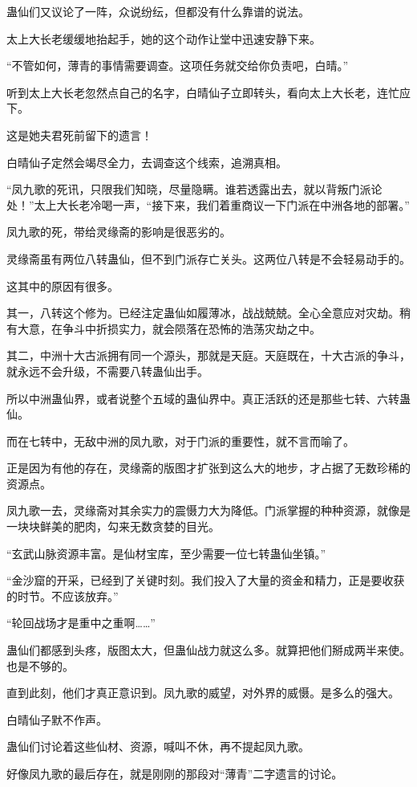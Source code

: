 \begin{this_body}
蛊仙们又议论了一阵，众说纷纭，但都没有什么靠谱的说法。

太上大长老缓缓地抬起手，她的这个动作让堂中迅速安静下来。

“不管如何，薄青的事情需要调查。这项任务就交给你负责吧，白晴。”

听到太上大长老忽然点自己的名字，白晴仙子立即转头，看向太上大长老，连忙应下。

这是她夫君死前留下的遗言！

白晴仙子定然会竭尽全力，去调查这个线索，追溯真相。

“凤九歌的死讯，只限我们知晓，尽量隐瞒。谁若透露出去，就以背叛门派论处！”太上大长老冷喝一声，“接下来，我们着重商议一下门派在中洲各地的部署。”

凤九歌的死，带给灵缘斋的影响是很恶劣的。

灵缘斋虽有两位八转蛊仙，但不到门派存亡关头。这两位八转是不会轻易动手的。

这其中的原因有很多。

其一，八转这个修为。已经注定蛊仙如履薄冰，战战兢兢。全心全意应对灾劫。稍有大意，在争斗中折损实力，就会陨落在恐怖的浩荡灾劫之中。

其二，中洲十大古派拥有同一个源头，那就是天庭。天庭既在，十大古派的争斗，就永远不会升级，不需要八转蛊仙出手。

所以中洲蛊仙界，或者说整个五域的蛊仙界中。真正活跃的还是那些七转、六转蛊仙。

而在七转中，无敌中洲的凤九歌，对于门派的重要性，就不言而喻了。

正是因为有他的存在，灵缘斋的版图才扩张到这么大的地步，才占据了无数珍稀的资源点。

凤九歌一去，灵缘斋对其余实力的震慑力大为降低。门派掌握的种种资源，就像是一块块鲜美的肥肉，勾来无数贪婪的目光。

“玄武山脉资源丰富。是仙材宝库，至少需要一位七转蛊仙坐镇。”

“金沙窟的开采，已经到了关键时刻。我们投入了大量的资金和精力，正是要收获的时节。不应该放弃。”

“轮回战场才是重中之重啊……”

蛊仙们都感到头疼，版图太大，但蛊仙战力就这么多。就算把他们掰成两半来使。也是不够的。

直到此刻，他们才真正意识到。凤九歌的威望，对外界的威慑。是多么的强大。

白晴仙子默不作声。

蛊仙们讨论着这些仙材、资源，喊叫不休，再不提起凤九歌。

好像凤九歌的最后存在，就是刚刚的那段对“薄青”二字遗言的讨论。


\end{this_body}
